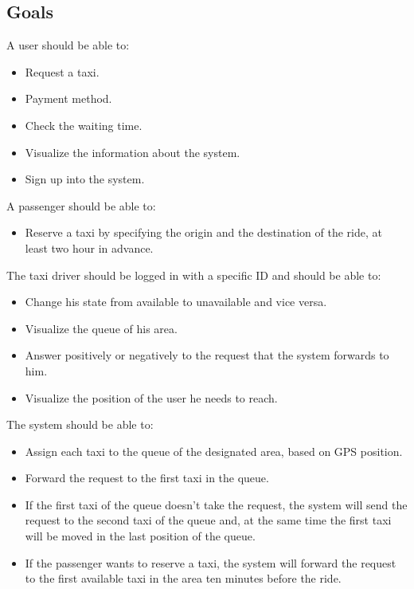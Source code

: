 \documentclass[18pt,oneside,a4paper, titlepage]{article}
\begin{document}
	\subsection{Goals}
	A user should be able to:
	\begin{itemize}
		\item Request a taxi.
		\item Payment method.
		\item Check the waiting time.
		\item Visualize the information about the system.
		\item Sign up into the system.
	\end{itemize}
	A passenger should be able to:
	\begin{itemize}
		\item Reserve a taxi by specifying the origin and the destination of the ride, at least two hour in advance.
	\end{itemize}
	The taxi driver should be logged in with a specific ID and should be able to:
	\begin{itemize}
		\item Change his state from available to unavailable and vice versa.
		\item Visualize the queue of his area.
		\item Answer positively or negatively to the request that the system forwards to him.
		\item Visualize the position of the user he needs to reach.
	\end{itemize}
	The system should be able to:
	\begin{itemize}
		\item Assign each taxi to the queue of the designated area, based on GPS position.
		\item Forward the request to the first taxi in the queue.
		\item If the first taxi of the queue doesn't take the request, the system will send the request to the second taxi of the queue and, at the same time the first taxi will be moved in the last position of the queue.
		\item If the passenger wants to reserve a taxi, the system will forward the request to the first available taxi in the area ten minutes before the ride.
	\end{itemize}
	
\end{document}
